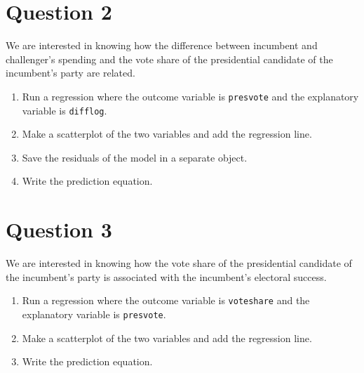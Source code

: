 \documentclass[12pt,letterpaper]{article}
\begin{document}
\newpage

\section*{Question 2}%
\noindent We are interested in knowing how the difference between incumbent and challenger's spending and the vote share of the presidential candidate of the incumbent's party are related.	\vspace{.25cm}
\begin{enumerate}
\item Run a regression where the outcome variable is \texttt{presvote} and the explanatory variable is \texttt{difflog}.	\vspace{5cm}
\item Make a scatterplot of the two variables and add the regression line. 	\vspace{5cm}
\item Save the residuals of the model in a separate object.	\vspace{5cm}
\item Write the prediction equation.
\end{enumerate}

\newpage	
\section*{Question 3}%

\noindent We are interested in knowing how the vote share of the presidential candidate of the incumbent's party is associated with the incumbent's electoral success.
\vspace{.25cm}
\begin{enumerate}
\item Run a regression where the outcome variable is \texttt{voteshare} and the explanatory variable is \texttt{presvote}.
\vspace{5cm}
\item Make a scatterplot of the two variables and add the regression line. 
\vspace{5cm}
\item Write the prediction equation.
\end{enumerate}


\newpage	
\end{document}
